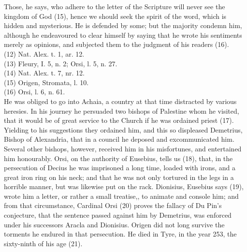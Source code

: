 \documentclass[12pt]{book}
\begin{document}
Those, he says, who adhere to the letter of the Scripture will never see the kingdom of God (15), hence we
should seek the spirit of the word, which is hidden and mysterious. He is defended by some; but the
majority condemn him, although he endeavoured to clear himself by saying that he wrote his sentiments
merely as opinions, and subjected them to the judgment of his readers (16).\\
(12) Nat. Alex. t. 1, ar. 12.\\
(13) Fleury, I. 5, n. 2; Orsi, l. 5, n. 27.\\
(14) Nat. Alex. t. 7, nr. 12.\\
(15) Origen, Stromata, l. 10.\\
(16) Orsi, l. 6, n. 61.\\

He was obliged to go into Achaia, a country at that time distracted by various heresies. In his journey he
persuaded two bishops of Palestine whom he visited, that it would be of great service to the Church if he
was ordained priest (17). Yielding to his suggestions they ordained him, and this so displeased
Demetrius, Bishop of Alexandria, that in a council he deposed and excommunicated him. Several other
bishops, however, received him in his misfortunes, and entertained him honourably. Orsi, on the
authority of Eusebius, tells us (18), that, in the persecution of Decius he was imprisoned a long time,
loaded with irons, and a great iron ring on his neck; and that he was not only tortured in the legs in a
horrible manner, but was likewise put on the rack. Dionisius, Eusebius says (19), wrote him a letter, or
rather a small treatise,, to animate and console him; and from that circumstance, Cardinal Orsi (20)
proves the fallacy of Du Pin’s conjecture, that the sentence passed against him by Demetrius, was
enforced under his successors Aracla and Dionisius. Origen did not long survive the torments he endured
in that persecution. He died in Tyre, in the year 253, the sixty-ninth of his age (21).
\end{document}

